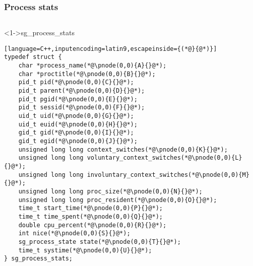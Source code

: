 \documentclass[ngerman,xcolor={table,dvipsnames},smaller,compress,hyperref={bookmarks,colorlinks}]{beamer}
\begin{document}
\begin{frame}[fragile]
\frametitle{Process stats}
\begin{columns}[t]
\begin{column}{.5\textwidth}
\begin{block}<1->{sg\_process\_stats}
\tiny
\begin{lstlisting}[language=C++,inputencoding=latin9,escapeinside={(*@}{@*)}]
typedef struct {
    char *process_name(*@\pnode(0,0){A}{}@*);
    char *proctitle(*@\pnode(0,0){B}{}@*);
    pid_t pid(*@\pnode(0,0){C}{}@*);
    pid_t parent(*@\pnode(0,0){D}{}@*);
    pid_t pgid(*@\pnode(0,0){E}{}@*);
    pid_t sessid(*@\pnode(0,0){F}{}@*);
    uid_t uid(*@\pnode(0,0){G}{}@*);
    uid_t euid(*@\pnode(0,0){H}{}@*);
    gid_t gid(*@\pnode(0,0){I}{}@*);
    gid_t egid(*@\pnode(0,0){J}{}@*);
    unsigned long long context_switches(*@\pnode(0,0){K}{}@*);
    unsigned long long voluntary_context_switches(*@\pnode(0,0){L}{}@*);
    unsigned long long involuntary_context_switches(*@\pnode(0,0){M}{}@*);
    unsigned long long proc_size(*@\pnode(0,0){N}{}@*);
    unsigned long long proc_resident(*@\pnode(0,0){O}{}@*);
    time_t start_time(*@\pnode(0,0){P}{}@*);
    time_t time_spent(*@\pnode(0,0){Q}{}@*);
    double cpu_percent(*@\pnode(0,0){R}{}@*);
    int nice(*@\pnode(0,0){S}{}@*);
    sg_process_state state(*@\pnode(0,0){T}{}@*);
    time_t systime(*@\pnode(0,0){U}{}@*);
} sg_process_stats;
\end{lstlisting}
\end{block}
\end{column}


\end{columns}
\end{frame}
\end{document}
